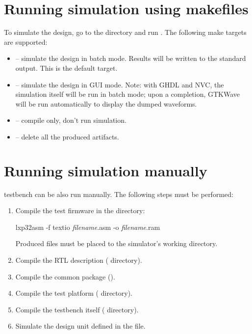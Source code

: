 \documentclass[a4paper,12pt,twoside,extrafontsizes]{memoir}
\begin{document}
\section{Running simulation using makefiles}

To simulate the design, go to the  directory and run . The following make targets are supported:

\begin{itemize}
	\item {} -- simulate the design in batch mode. Results will be written to the standard output. This is the default target.
	\item {} -- simulate the design in GUI mode. Note: with GHDL and NVC, the simulation itself will be run in batch mode; upon a completion, GTKWave will be run automatically to display the dumped waveforms.
	\item {} -- compile only, don't run simulation.
	\item {} -- delete all the produced artifacts.
\end{itemize}

\section{Running simulation manually}
\label{sec:simmanual}

\lxp{} testbench can be also run manually. The following steps must be performed:

\begin{enumerate}
	\item Compile the test firmware in the  directory:
	
	\begin{codepar}
    lxp32asm -f textio \emph{filename}.asm -o \emph{filename}.ram
	\end{codepar}
	
	Produced  files must be placed to the simulator's working directory.
	\item Compile the \lxp{} RTL description ( directory).
	\item Compile the common package ().
	\item Compile the test platform ( directory).
	\item Compile the testbench itself ( directory).
	\item Simulate the  design unit defined in the  file.
\end{enumerate}
\end{document}
